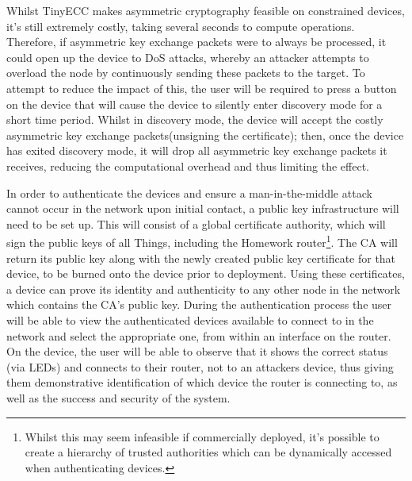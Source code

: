 \documentclass{mprop}
\begin{document}
Whilst TinyECC makes asymmetric cryptography feasible on constrained devices, it's still extremely costly, taking several seconds to compute operations. Therefore, if asymmetric key exchange packets were to always be processed, it could open up the device to DoS attacks, whereby an attacker attempts to overload the node by continuously sending these packets to the target. To attempt to reduce the impact of this, the user will be required to press a button on the device that will cause the device to silently enter discovery mode for a short time period. Whilst in discovery mode, the device will accept the costly asymmetric key exchange packets(unsigning the certificate); then, once the device has exited discovery mode, it will drop all asymmetric key exchange packets it receives, reducing the computational overhead and thus limiting the effect.

In order to authenticate the devices and ensure a man-in-the-middle attack cannot occur in the network upon initial contact, a public key infrastructure will need to be set up. This will consist of a global certificate authority, which will sign the public keys of all Things, including the Homework router\footnote{Whilst this may seem infeasible if commercially deployed, it's possible to create a hierarchy of trusted authorities which can be dynamically accessed when authenticating devices.}. The CA will return its public key along with the newly created public key certificate for that device, to be burned onto the device prior to deployment. Using these certificates, a device can prove its identity and authenticity to any other node in the network which contains the CA's public key. During the authentication process the user will be able to view the authenticated devices available to connect to in the network and select the appropriate one, from within an interface on the router. On the device, the user will be able to observe that it shows the correct status (via LEDs) and connects to their router, not to an attackers device, thus giving them demonstrative identification of which device the router is connecting to, as well as the success and security of the system.
\end{document}

